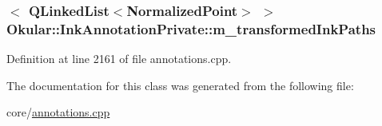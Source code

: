 \hypertarget{classOkular_1_1InkAnnotationPrivate_adf52505a0430541073d84918ee65f31e}{
\subsubsection[{m\+\_\+transformed\+Ink\+Paths}]{$<$ {\bf Q\+Linked\+List}$<${\bf Normalized\+Point}$>$ $>$ Okular\+::\+Ink\+Annotation\+Private\+::m\+\_\+transformed\+Ink\+Paths}}\label{classOkular_1_1InkAnnotationPrivate_adf52505a0430541073d84918ee65f31e}


Definition at line 2161 of file annotations.\+cpp.



The documentation for this class was generated from the following file\+:\begin{DoxyCompactItemize}
\item 
core/\hyperlink{annotations_8cpp}{annotations.\+cpp}\end{DoxyCompactItemize}
